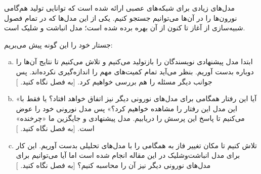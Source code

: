 مدل‌های زیادی برای شبکه‌های عصبی ارائه شده است که توانایی تولید هم‌گامی نورون‌ها را در آن‌ها می‌توانیم جستجو کنیم. یکی از این مدل‌ها که در تمام فصول شبیه‌سازی از آغاز تا کنون از آن بهره برده شده است؛ مدل انباشت و شلیک است\cite{brunel2007quantitative}. 

جستار خود را این گونه پیش می‌بریم:
\begin{enumerate}[(a)]
	\item
	ابتدا مدل پیشنهادی نویسندگان \cite{PhysRevLett.105.158104} را بازتولید می‌کنیم و تلاش می‌کنیم تا نتایج آن‌ها را دوباره بدست آوریم. بنظر می‌آید تمام کمیت‌های مهم را اندازه‌گیری نکرده‌اند. پس جوانب دیگر مسئله را هم بررسی خواهیم کرد. [به فصل 
	نگاه کنید.
	]
	\item 
	«آیا این رفتار همگامی برای مدل‌های نورونی دیگر نیز اتفاق خواهد افتاد؟ یا فقط با این مدل این رفتار را مشاهده خواهیم کرد؟» پس مدل نورونی خود را عوض می‌کنیم تا پاسخ این پرسش را دریابیم. مدل پیشنهادی و جایگزین ما «چرخنده» است. [به فصل 
	نگاه کنید.
	]
	\item 
	تلاش کنیم تا مکان تغییر فاز به همگامی را با مدل‌های تحلیلی بدست آوریم. این کار برای مدل انباشت‌وشلیک در این مقاله 
	\cite{brunel2000dynamics}
	انجام شده است اما آیا می‌توانیم برای مدل‌های نورونی دیگر نیز آن را محاسبه کنیم؟ [به فصل 
	نگاه کنید.
	]
\end{enumerate}
